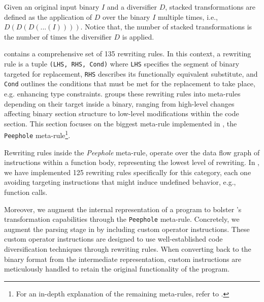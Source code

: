 \begin{definition}\label{stack_transform}
    Given an original input \Wasm binary $I$ and a diversifier $D$, stacked transformations are defined as the application of $D$ over the binary $I$ multiple times, i.e., $D(D(D(...(I))))$.  Notice that, the number of stacked transformations is the number of times the diversifier $D$ is applied.
\end{definition}


\label{custom}

\tool contains a comprehensive set of 135 rewriting rules.
In this context, a rewriting rule is a tuple \texttt{(LHS, RHS, Cond)} where \texttt{LHS} specifies the segment of binary targeted for replacement, \texttt{RHS} describes its functionally equivalent substitute, and \texttt{Cond} outlines the conditions that must be met for the replacement to take place, e.g. enhancing type constraints.
\tool groups these rewriting rules into meta-rules depending on their target inside a \wasm binary, ranging from high-level changes affecting binary section structure to low-level modifications within the code section. 
This section focuses on the biggest meta-rule implemented in \tool, the \texttt{Peephole} meta-rule\footnote{For an in-depth explanation of the remaining meta-rules, refer to \cite{wasmmutate}.}. 

Rewriting rules inside the \emph{Peephole} meta-rule, operate over the data flow graph of instructions within a function body, representing the lowest level of rewriting.  
In \tool, we have implemented 125 rewriting rules specifically for this category, each one avoiding targeting instructions that might induce undefined behavior, e.g., function calls.

Moreover, we augment the internal representation of a \wasm program to bolster \tool's transformation capabilities through the \texttt{Peephole} meta-rule.
Concretely, we augment the parsing stage in \tool by including custom operator instructions.
These custom operator instructions are designed to use well-established code diversification techniques through rewriting rules.
When converting back to the \Wasm binary format from the intermediate representation, custom instructions are meticulously handled to retain the original functionality of the \Wasm program. 


